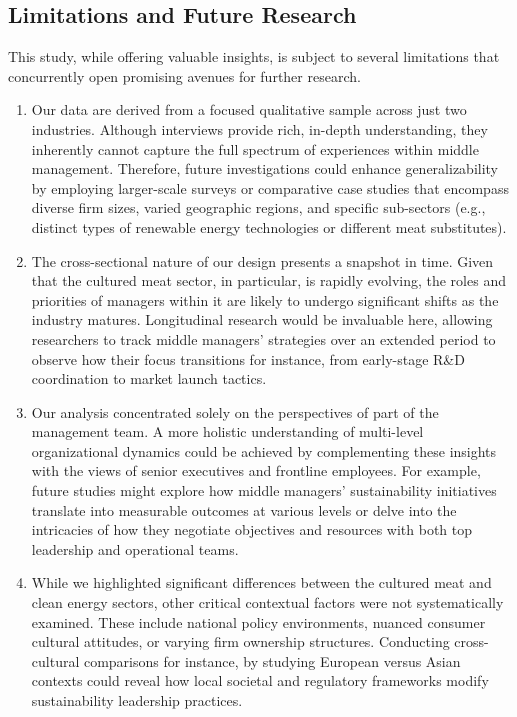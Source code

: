 	\subsection{Limitations and Future Research}
	This study, while offering valuable insights, is subject to several limitations that concurrently open promising avenues for further research.
	\begin{enumerate}
		\item Our data are derived from a focused qualitative sample across just two industries. Although interviews provide rich, in-depth understanding, they inherently cannot capture the full spectrum of experiences within middle management. Therefore, future investigations could enhance generalizability by employing larger-scale surveys or comparative case studies that encompass diverse firm sizes, varied geographic regions, and specific sub-sectors (e.g., distinct types of renewable energy technologies or different meat substitutes).
		
		\item The cross-sectional nature of our design presents a snapshot in time. Given that the cultured meat sector, in particular, is rapidly evolving, the roles and priorities of managers within it are likely to undergo significant shifts as the industry matures. Longitudinal research would be invaluable here, allowing researchers to track middle managers' strategies over an extended period to observe how their focus transitions for instance, from early-stage R\&D coordination to market launch tactics.
		
		\item Our analysis concentrated solely on the perspectives of part of the management team. A more holistic understanding of multi-level organizational dynamics could be achieved by complementing these insights with the views of senior executives and frontline employees. For example, future studies might explore how middle managers' sustainability initiatives translate into measurable outcomes at various levels or delve into the intricacies of how they negotiate objectives and resources with both top leadership and operational teams.
		
		\item While we highlighted significant differences between the cultured meat and clean energy sectors, other critical contextual factors were not systematically examined. These include national policy environments, nuanced consumer cultural attitudes, or varying firm ownership structures. Conducting cross-cultural comparisons for instance, by studying European versus Asian contexts could reveal how local societal and regulatory frameworks modify sustainability leadership practices.
	\end{enumerate}

